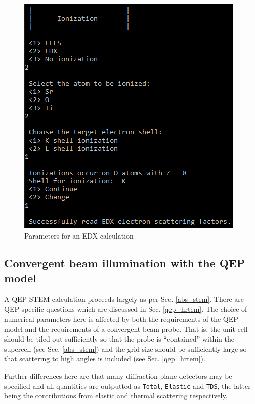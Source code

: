 \documentclass[12pt,a4paper]{article}
\begin{document}
\begin{figure}[!h]
\begin{center}
    \includegraphics[scale=0.75]{cb_abs_EDX.png}
\caption{Parameters for an EDX calculation}
\label{fig:cb_abs_EDX}
\end{center}
\end{figure}





\subsection{Convergent beam illumination with the QEP model}

A QEP STEM calculation proceeds largely as per Sec. \ref{abs_stem}.
There are QEP specific questions which are discussed in Sec. \ref{qep_hrtem}.
The choice of numerical parameters here is affected by both the requirements of the QEP model and the requirements of a convergent-beam probe.
That is, the unit cell should be tiled out sufficiently so that the probe is ``contained'' within the supercell (see Sec. \ref{abs_stem}) and the grid size should be sufficiently large so that scattering to high angles is included (see Sec. \ref{qep_hrtem}).

Further differences here are that many diffraction plane detectors may be specified and all quantities are outputted as \verb|Total|, \verb|Elastic| and \verb|TDS|, the latter being the contributions from elastic and thermal scattering respectively.



\end{document}
